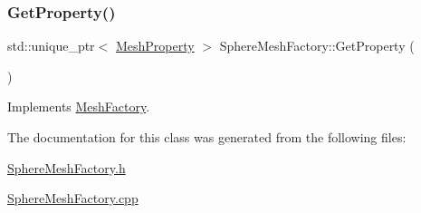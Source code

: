 \mbox{\label{class_sphere_mesh_factory_af19b3922356cc71d20213556b0eb98a6}} 
\subsubsection{\texorpdfstring{GetProperty()}{GetProperty()}}
{\footnotesize\ttfamily std\+::unique\+\_\+ptr$<$ \mbox{\hyperlink{class_mesh_property}{Mesh\+Property}} $>$ Sphere\+Mesh\+Factory\+::\+Get\+Property (\begin{DoxyParamCaption}{ }\end{DoxyParamCaption})\hspace{0.3cm}{\ttfamily [virtual]}}



Implements \mbox{\hyperlink{class_mesh_factory_abff50d215458843dd98271ab803a7671}{Mesh\+Factory}}.



The documentation for this class was generated from the following files\+:\begin{DoxyCompactItemize}
\item 
\mbox{\hyperlink{_sphere_mesh_factory_8h}{Sphere\+Mesh\+Factory.\+h}}\item 
\mbox{\hyperlink{_sphere_mesh_factory_8cpp}{Sphere\+Mesh\+Factory.\+cpp}}\end{DoxyCompactItemize}
